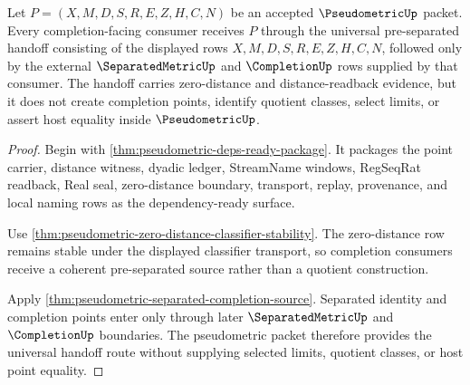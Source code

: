 \begin{theorem}
\label{thm:pseudometric-completion-universal-handoff}
Let $P=(X,M,D,S,R,E,Z,H,C,N)$ be an accepted $\PseudometricUp$ packet. Every completion-facing consumer receives $P$ through the universal pre-separated handoff consisting of the displayed rows $X,M,D,S,R,E,Z,H,C,N$, followed only by the external $\SeparatedMetricUp$ and $\CompletionUp$ rows supplied by that consumer. The handoff carries zero-distance and distance-readback evidence, but it does not create completion points, identify quotient classes, select limits, or assert host equality inside $\PseudometricUp$.
\end{theorem}
\begin{proof}
Begin with \autoref{thm:pseudometric-deps-ready-package}. It packages the point carrier, distance witness, dyadic ledger, StreamName windows, RegSeqRat readback, Real seal, zero-distance boundary, transport, replay, provenance, and local naming rows as the dependency-ready surface.

Use \autoref{thm:pseudometric-zero-distance-classifier-stability}. The zero-distance row remains stable under the displayed classifier transport, so completion consumers receive a coherent pre-separated source rather than a quotient construction.

Apply \autoref{thm:pseudometric-separated-completion-source}. Separated identity and completion points enter only through later $\SeparatedMetricUp$ and $\CompletionUp$ boundaries. The pseudometric packet therefore provides the universal handoff route without supplying selected limits, quotient classes, or host point equality.
\end{proof}

